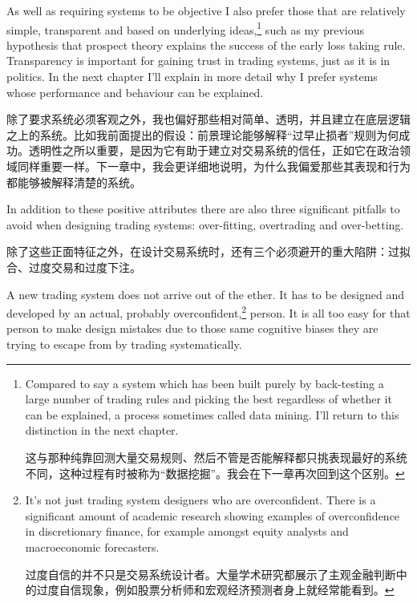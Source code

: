 \bipairgap

\begin{englishblock} As well as requiring systems to be objective I also prefer those that are relatively simple, transparent and based on underlying ideas,\footnote{Compared to say a system which has been built purely by back-testing a large number of trading rules and picking the best regardless of whether it can be explained, a process sometimes called data mining. I'll return to this distinction in the next chapter. \par 这与那种纯靠回测大量交易规则、然后不管是否能解释都只挑表现最好的系统不同，这种过程有时被称为“数据挖掘”。我会在下一章再次回到这个区别。} such as my previous hypothesis that prospect theory explains the success of the early loss taking rule. Transparency is important for gaining trust in trading systems, just as it is in politics. In the next chapter I'll explain in more detail why I prefer systems whose performance and behaviour can be explained. \end{englishblock}

\begin{chineseblock}除了要求系统必须客观之外，我也偏好那些相对简单、透明，并且建立在底层逻辑之上的系统。比如我前面提出的假设：前景理论能够解释“过早止损者”规则为何成功。透明性之所以重要，是因为它有助于建立对交易系统的信任，正如它在政治领域同样重要一样。下一章中，我会更详细地说明，为什么我偏爱那些其表现和行为都能够被解释清楚的系统。\end{chineseblock}

\bipairgap

\begin{englishblock} In addition to these positive attributes there are also three significant pitfalls to avoid when designing trading systems: over-fitting, overtrading and over-betting. \end{englishblock}

\begin{chineseblock}除了这些正面特征之外，在设计交易系统时，还有三个必须避开的重大陷阱：过拟合、过度交易和过度下注。\end{chineseblock}


\begin{englishblock} A new trading system does not arrive out of the ether. It has to be designed and developed by an actual, probably overconfident,\footnote{It's not just trading system designers who are overconfident. There is a significant amount of academic research showing examples of overconfidence in discretionary finance, for example amongst equity analysts and macroeconomic forecasters. \par 过度自信的并不只是交易系统设计者。大量学术研究都展示了主观金融判断中的过度自信现象，例如股票分析师和宏观经济预测者身上就经常能看到。} person. It is all too easy for that person to make design mistakes due to those same cognitive biases they are trying to escape from by trading systematically. \end{englishblock}

